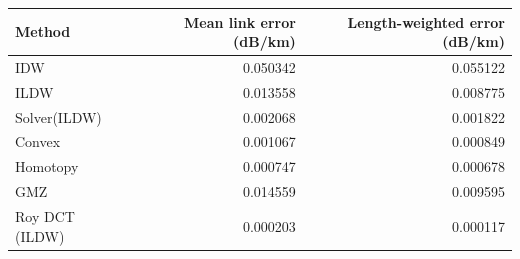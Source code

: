 \begin{tabular}{lrr}\toprule
Method & Mean link error (dB/km) & Length-weighted error (dB/km) \\ \midrule
IDW & 0.050342 & 0.055122 \\
ILDW & 0.013558 & 0.008775 \\
Solver(ILDW) & 0.002068 & 0.001822 \\
Convex & 0.001067 & 0.000849 \\
Homotopy & 0.000747 & 0.000678 \\
GMZ & 0.014559 & 0.009595 \\
Roy DCT (ILDW) & 0.000203 & 0.000117 \\
\bottomrule\end{tabular}
